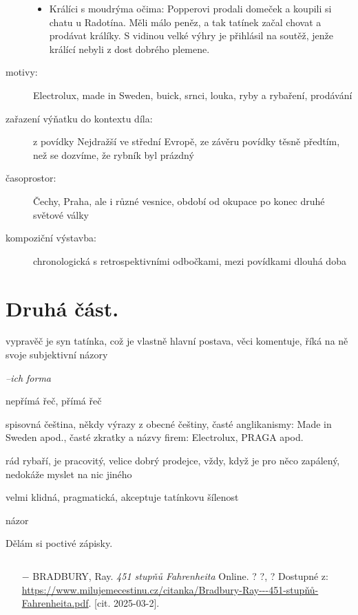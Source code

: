 \documentclass{article}
\begin{document}
\begin{description}
\begin{itemize}
   	\item Králíci s moudrýma očima: Popperovi prodali domeček a koupili si chatu u Radotína. Měli málo peněz, a tak tatínek začal chovat a prodávat králíky. S vidinou velké výhry je přihlásil na soutěž, jenže králící nebyli z dost dobrého plemene.
    \end{itemize}
    \item[motivy:] Electrolux, made in Sweden, buick, srnci, louka, ryby a rybaření, prodávání
    \item[zařazení výňatku do kontextu díla:] z povídky Nejdražší ve střední Evropě, ze závěru povídky těsně předtím, než se dozvíme, že rybník byl prázdný
    \item[časoprostor:] Čechy, Praha, ale i různé vesnice, období od okupace po konec druhé světové války
    \item[kompoziční výstavba:] chronologická s retrospektivními odbočkami, mezi povídkami dlouhá doba
\end{description}
\section{Druhá část.}
\begin{description}
    \setlength\itemsep{0.15em}
    \item[vypravěč:] vypravěč je syn tatínka, což je vlastně hlavní postava, věci komentuje, říká na ně svoje subjektivní názory
    \item[vyprávěcí způsoby:] \textit{--ich forma}
    \item[typy promluv:] nepřímá řeč, přímá řeč
    \item[jazyková stránka:] spisovná čeština, někdy výrazy z obecné češtiny, časté anglikanismy: Made in Sweden apod., časté zkratky a názvy firem: Electrolux, PRAGA apod.
    \item[postavy:]
        \begin{description}
            \setlength\itemsep{0.15em}
 			\item[tatínek,] rád rybaří, je pracovitý, velice dobrý prodejce, vždy, když je pro něco zapálený, nedokáže myslet na nic jiného
            \item[maminka,] velmi klidná, pragmatická, akceptuje tatínkovu šílenost
        \end{description}
    \item[názor:] názor
    \item[kontext:]  Dělám si poctivé zápisky.
    \item[zdroje:] $ $
    \begin{itemize}
        \setlength\itemsep{0em}
        \item[$-$] BRADBURY, Ray. \textit{451 stupňů Fahrenheita} Online. ? ?, ? Dostupné z: \url{https://www.milujemecestinu.cz/citanka/Bradbury-Ray---451-stupňů-Fahrenheita.pdf}. [cit. 2025-03-2].
    \end{itemize}
\end{description}
\end{document}
